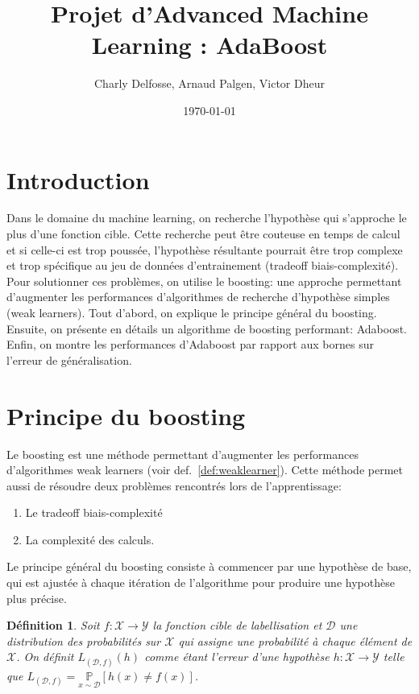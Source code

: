 \documentclass[12pt]{article}
\title{Projet d'Advanced Machine Learning : AdaBoost}
\date{\today}
\author{Charly Delfosse, Arnaud Palgen, Victor Dheur}
\newtheorem{definition}{Définition}
\begin{document}
	\maketitle
	
	\section{Introduction}
	
	Dans le domaine du machine learning, on recherche l'hypothèse qui s'approche le plus d'une fonction cible. Cette recherche peut être couteuse en temps de calcul et si celle-ci est trop poussée, l'hypothèse résultante pourrait être trop complexe et trop spécifique au jeu de données d'entrainement (tradeoff biais-complexité). Pour solutionner ces problèmes, on utilise le boosting: une approche permettant d'augmenter les performances d'algorithmes de recherche d'hypothèse simples (weak learners). Tout d'abord, on explique le principe général du boosting. Ensuite, on présente en détails un algorithme de boosting performant: Adaboost. Enfin, on montre les performances d'Adaboost par rapport aux bornes sur l'erreur de généralisation.
	
	\section{Principe du boosting}
	
	Le boosting est une méthode permettant d'augmenter les performances\\ d'algorithmes weak learners (voir def.~\ref{def:weaklearner}). Cette méthode permet aussi de résoudre deux problèmes
	rencontrés lors de l'apprentissage:
	\begin{enumerate}
		\item Le tradeoff biais-complexité
		\item La complexité des calculs.
	\end{enumerate}
	Le principe général du boosting consiste à commencer par une hypothèse de base,
	qui est ajustée à chaque itération de l'algorithme pour produire une hypothèse plus précise.
	
	
	\begin{definition}
	Soit $f: \mathcal{X} \rightarrow \mathcal{Y}$ la fonction cible de labellisation et $\mathcal{D}$ une distribution des probabilités sur $\mathcal{X}$ qui assigne une probabilité à chaque élément de $\mathcal{X}$. On définit $L_{(\mathcal{D},f)}(h)$ comme étant l'erreur d'une hypothèse $h: \mathcal{X} \rightarrow \mathcal{Y}$ telle que $L_{(\mathcal{D},f)} = \underset{x \sim \mathcal{D}}{\mathbb{P}} [h(x) \neq f(x)]$.
	\end{definition}	
	
\end{document}
